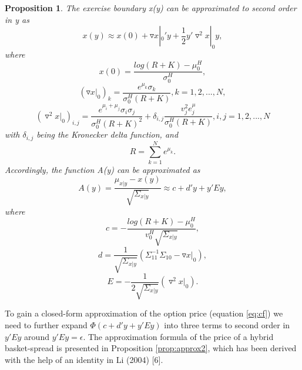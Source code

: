 \documentclass[a4paper]{article}
\newtheorem{prop}{Proposition}
\begin{document}
\begin{prop}
\label{prop:approx}
The exercise boundary x(y) can be approximated to second order in y as
$$x(y)\approx x(0)+\triangledown x|_0'y+\frac{1}{2}y'\triangledown^2x|_0y,$$
where
$$x(0)=\frac{log(R+K)-\mu_0^H}{\sigma_0^H},$$
$$(\triangledown x|_0)_k=\frac{e^{\mu_k}\sigma_k}{\sigma_0^H(R+K)},k=1,2,...,N,$$
$$(\triangledown^2 x|_0)_{i,j}=\frac{e^{\mu_i+\mu_j}\sigma_i\sigma_j}{\sigma_0^H(R+K)^2}+\delta_{i,j}\frac{v_j^2e^\mu_j}{\sigma_0^H(R+K)},i,j=1,2,...,N$$
with $\delta_{i,j}$ being the Kronecker delta function, and
$$R=\sum_{k=1}^Ne^{\mu_k}.$$
Accordingly, the function A(y) can be approximated as
$$A(y)=\frac{\mu_{x|y}-x(y)}{\sqrt{\Sigma_{x|y}}}\approx c+d'y+y'Ey,$$
where
$$c=-\frac{log(R+K)-\mu_0^H}{v_0^H\sqrt{\Sigma_{x|y}}},$$
$$d=\frac{1}{\sqrt{\Sigma_{x|y}}}(\Sigma_{11}^{-1}\Sigma_{10}-\triangledown x|_0),$$
$$E=-\frac{1}{2\sqrt{\Sigma_{x|y}}}(\triangledown^2 x|_0).$$
\end{prop}
To gain a closed-form approximation of the option price (equation \ref{eq:cf}) we need to further expand $\Phi(c+d'y+y'Ey)$ into three terms to second order in $y'Ey$ around $y'Ey=\epsilon$. The approximation formula of the price of a hybrid basket-spread is presented in Proposition \ref{prop:approx2}, which has been derived with the help of an identity in Li (2004) [6]. 
\end{document}
